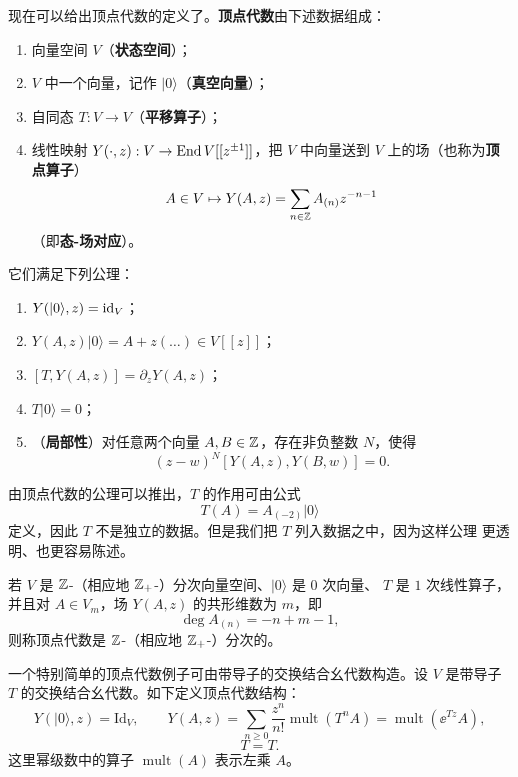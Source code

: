 现在可以给出顶点代数的定义了。\textbf{顶点代数}由下述数据组成：
\begin{enumerate}[label=(\arabic*)]
    \item 向量空间 $V$（\textbf{状态空间}）；
    \item $V$ 中一个向量，记作 $|0\rangle$（\textbf{真空向量}）；
    \item 自同态 $T:V\to V$（\textbf{平移算子}）；
    \item 线性映射 $Y(\cdot,z):V\to\operatorname{End} V[[z^{\pm1}]]$，把 $V$ 中向量送到
    $V$ 上的场（也称为\textbf{顶点算子}）
    \[
        A\in V\mapsto Y(A,z)=\sum_{n\in\mathbb{Z}}A_{(n)}z^{-n-1}
    \]
    （即\textbf{态-场对应}）。
\end{enumerate}
它们满足下列公理：
\begin{enumerate}[label=(\arabic*)]
    \item $Y(|0\rangle,z)=\mathrm{id}_V$；
    \item $Y(A,z)|0\rangle=A+z(\dots)\in V[[z]]$；
    \item $[T,Y(A,z)]=\partial_zY(A,z)$；
    \item $T|0\rangle=0$；
    \item（\textbf{局部性}）对任意两个向量 $A,B\in\mathbb{Z}$，存在非负整数 $N$，使得
    \[
        (z-w)^N[Y(A,z),Y(B,w)]=0.
    \]
\end{enumerate}

由顶点代数的公理可以推出，$T$ 的作用可由公式
\[
    T(A)=A_{(-2)}|0\rangle
\]
定义，因此 $T$ 不是独立的数据。但是我们把 $T$ 列入数据之中，因为这样公理
更透明、也更容易陈述。

若 $V$ 是 $\mathbb{Z}$-（相应地 $\mathbb{Z}_+$-）分次向量空间、$|0\rangle$ 是 $0$ 次向量、
$T$ 是 $1$ 次线性算子，并且对 $A\in V_m$，场 $Y(A,z)$ 的共形维数为 $m$，即
\[
    \deg A_{(n)}=-n+m-1,
\]
则称顶点代数是 $\mathbb{Z}$-（相应地 $\mathbb{Z}_+$-）分次的。

一个特别简单的顶点代数例子可由带导子的交换结合幺代数构造。设 $V$ 是带导子
$T$ 的交换结合幺代数。如下定义顶点代数结构：
\begin{equation}
    Y(|0\rangle,z)=\mathrm{Id}_V,\qquad
    Y(A,z)=\sum_{n\ge0}\frac{z^n}{n!}\operatorname{mult}(T^nA)
    =\operatorname{mult}(\ee^{Tz}A),
    \tag{2.2-1}
\end{equation}
\begin{equation}
    T=T.
    \tag{2.2-2}
\end{equation}
这里幂级数中的算子 $\operatorname{mult}(A)$ 表示左乘 $A$。

